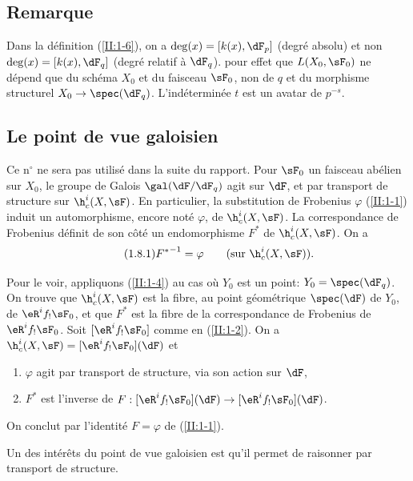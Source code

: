 \subsection{Remarque}\label{II:1-7}

Dans la définition (\ref{II:1-6}), on a $\deg(x)=[k(x),\dF_p]$ (degré 
absolu) et non $\deg(x)=[k(x),\dF_q]$ (degré relatif à $\dF_q$).  
pour effet que $L(X_0,\sF_0)$ ne dépend que du schéma $X_0$ et du faisceau 
$\sF_0$, non de $q$ et du morphisme structurel $X_0\to\spec(\dF_q)$. 
L'indéterminée $t$ est un avatar de $p^{-s}$. 





\subsection{Le point de vue galoisien}\label{II:1-8}

Ce n$^\circ$ ne sera pas utilisé dans la suite du rapport. Pour $\sF_0$ un 
faisceau abélien sur $X_0$, le groupe de Galois $\gal(\dF/\dF_q)$ agit sur 
$\dF$, et par transport de structure sur $\h_c^i(X,\sF)$. En particulier, la 
substitution de Frobenius $\varphi$ (\ref{II:1-1}) induit un automorphisme, 
encore noté $\varphi$, de $\h_c^i(X,\sF)$. La correspondance de Frobenius 
définit de son côté un endomorphisme $F^*$ de $\h_c^i(X,\sF)$. On a 
\begin{equation*}\tag{1.8.1}\label{II:eq:1-8-1}
  {F^*}^{-1} = \varphi \qquad \text{(sur $\h_c^i(X,\sF)$).}
\end{equation*}

Pour le voir, appliquons (\ref{II:1-4}) au cas où $Y_0$ est un point: 
$Y_0=\spec(\dF_q)$. On trouve que $\h_c^i(X,\sF)$ est la fibre, au point 
géométrique $\spec(\dF)$ de $Y_0$, de $\eR^i f_! \sF_0$, et que $F^*$ est 
la fibre de la correspondance de Frobenius de $\eR^i f_!\sF_0$. Soit 
$[\eR^i f_! \sF_0]$ comme en (\ref{II:1-2}). On a 
$\h_c^i(X,\sF) = [\eR^i f_!\sF_0](\dF)$ et 
\begin{enumerate}[\indent a)]
  \item $\varphi$ agit par transport de structure, via son action sur $\dF$, 
  \item {}$F^*$ est l'inverse de 
    $F:[\eR^i f_!\sF_0](\dF) \to [\eR^i f_!\sF_0](\dF)$. 
\end{enumerate}

On conclut par l'identité $F=\varphi$ de (\ref{II:1-1}). 

Un des intérêts du point de vue galoisien est qu'il permet de raisonner par 
transport de structure. 










